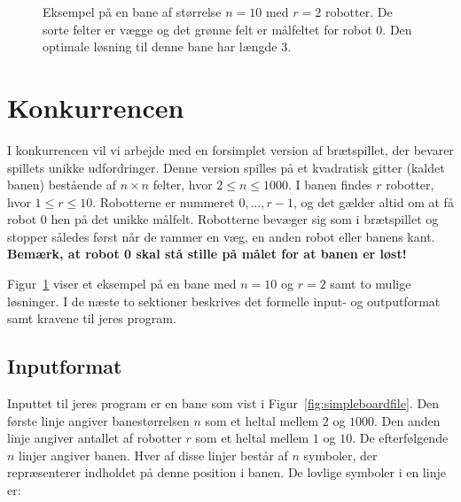 \documentclass[10pt,a4paper]{article}
\begin{document}
\begin{figure}
\centering
{}
\hspace{0.2cm}
\hspace{0.2cm}
\caption{Eksempel på en bane af størrelse $n=10$ med $r=2$ robotter. De sorte felter er vægge og det grønne felt er målfeltet for robot 0. Den optimale løsning til denne bane har længde 3.}
\label{fig:simpleboardexample}
\end{figure}

\section{Konkurrencen}
I konkurrencen vil vi arbejde med en forsimplet version af brætspillet, der bevarer spillets unikke udfordringer. Denne version spilles på et kvadratisk gitter (kaldet banen) bestående af $n \times n$ felter, hvor $2 \leq n \leq 1000$. I banen findes $r$ robotter, hvor $1 \leq r \leq 10$. Robotterne er nummeret $0, \ldots, r-1$, og det gælder altid om at få robot 0 hen på det unikke målfelt. Robotterne bevæger sig som i brætspillet og stopper således først når de rammer en væg, en anden robot eller banens kant. \textbf{Bemærk, at robot 0 skal stå stille på målet for at banen er løst!}

Figur~\ref{fig:simpleboardexample} viser et eksempel på en bane med $n=10$ og $r=2$ samt to mulige løsninger. I de næste to sektioner beskrives det formelle input- og outputformat samt kravene til jeres program.

\subsection{Inputformat}
Inputtet til jeres program er en bane som vist i Figur~\ref{fig:simpleboardfile}. Den første linje angiver banestørrelsen $n$ som et heltal mellem $2$ og $1000$. Den anden linje angiver antallet af robotter $r$ som et heltal mellem $1$ og $10$. De efterfølgende $n$ linjer angiver banen. Hver af disse linjer består af $n$ symboler, der repræsenterer indholdet på denne position i banen. De lovlige symboler i en linje er:
\end{document}
